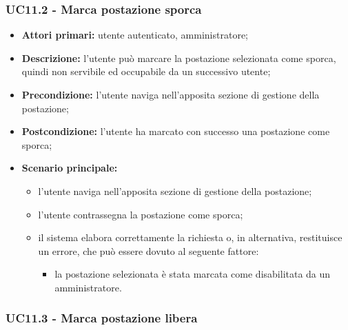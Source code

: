 \subsubsection{UC11.2 - Marca postazione sporca}

\begin{itemize}
\item \textbf{Attori primari:} utente autenticato, amministratore;
\item \textbf{Descrizione:} l’utente può marcare la postazione selezionata come sporca, quindi non servibile ed occupabile da un successivo utente;
\item \textbf{Precondizione:} l’utente naviga nell’apposita sezione di gestione della postazione; 
\item \textbf{Postcondizione:} l’utente ha marcato con successo una postazione come sporca;
\item \textbf{Scenario principale:} 
	\begin{itemize}
		\item l’utente naviga nell’apposita sezione di gestione della postazione;		
		\item l’utente contrassegna la postazione come sporca;
		\item il sistema elabora correttamente la richiesta o, in alternativa, restituisce un errore, che può essere dovuto al seguente fattore:
		\begin{itemize}
			\item la postazione selezionata è stata marcata come disabilitata da un amministratore.
		\end{itemize}
	\end{itemize}
\end{itemize}
\newpage
\subsubsection{UC11.3 - Marca postazione libera}

